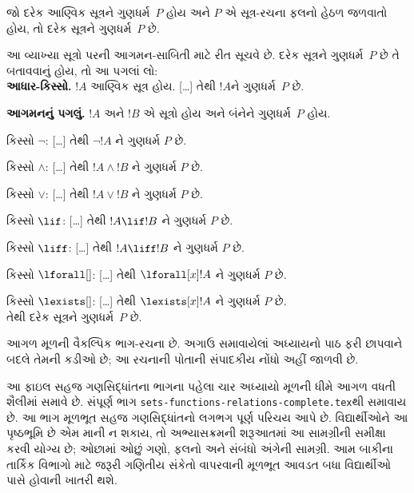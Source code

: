 \begin{defn}[સૂત્રો પર આગમન]
જો દરેક આણ્વિક સૂત્રને ગુણધર્મ~$P$ હોય અને
$P$ એ સૂત્ર-રચના ફલનો હેઠળ જળવાતો હોય,
તો દરેક સૂત્રને ગુણધર્મ~$P$ છે.
\end{defn}

\begin{explain}
આ વ્યાખ્યા સૂત્રો પરની આગમન-સાબિતી માટે રીત સૂચવે છે.
દરેક સૂત્રને ગુણધર્મ~$P$ છે તે બતાવવાનું હોય,
તો આ પગલાં લો:\\

\textbf{આધાર-કિસ્સો.} $!A$ આણ્વિક સૂત્ર હોય.
[\ldots] તેથી $!A$ને ગુણધર્મ~$P$ છે.

\textbf{આગમનનું પગલું.} $!A$ અને $!B$ એ સૂત્રો હોય
અને બંનેને ગુણધર્મ~$P$ હોય.

કિસ્સો $\lnot$: [\ldots] તેથી $\lnot !A$ ને ગુણધર્મ $P$ છે.

કિસ્સો $\land$: [\ldots] તેથી $!A \land !B$ ને ગુણધર્મ $P$ છે.

કિસ્સો $\lor$: [\ldots] તેથી $!A \lor !B$ ને ગુણધર્મ $P$ છે.

કિસ્સો $\lif$: [\ldots] તેથી $!A \lif !B$ ને ગુણધર્મ $P$ છે.

કિસ્સો $\liff$: [\ldots] તેથી $!A \liff !B$ ને ગુણધર્મ $P$ છે.

કિસ્સો $\lforall[]$: [\ldots] તેથી $\lforall[x] !A$ ને ગુણધર્મ $P$ છે.

કિસ્સો $\lexists[]$: [\ldots] તેથી $\lexists[x] !A$ ને ગુણધર્મ $P$ છે. \\

તેથી દરેક સૂત્રને ગુણધર્મ~$P$ છે.
\end{explain}
\endgroup

\begin{editorial}
આગળ મૂળની વૈકલ્પિક ભાગ-રચના છે. અગાઉ સમાવાયેલાં અધ્યાયનો પાઠ ફરી છાપવાને બદલે તેમની કડીઓ છે; આ રચનાની પોતાની સંપાદકીય નોંધો અહીં જાળવી છે.
\end{editorial}
\begingroup
\makeatletter{}\makeatother

\label{guunit:OLP-0720}


\begin{editorial}
  આ ફાઇલ સહજ ગણસિદ્ધાંતના ભાગના પહેલા ચાર અધ્યાયો
  મૂળની ધીમે આગળ વધતી શૈલીમાં સમાવે છે.
  સંપૂર્ણ ભાગ \verb|sets-functions-relations-complete.tex|થી સમાવાય છે.
  આ ભાગ મૂળભૂત સહજ ગણસિદ્ધાંતનો લગભગ પૂર્ણ પરિચય આપે છે.
  વિદ્યાર્થીઓને આ પૃષ્ઠભૂમિ છે એમ માની ન શકાય,
  તો અભ્યાસક્રમની શરૂઆતમાં આ સામગ્રીની સમીક્ષા કરવી યોગ્ય છે;
  ઓછામાં ઓછું ગણો, ફલનો અને સંબંધો અંગેની સામગ્રી.
  આમ બાકીના તાર્કિક વિભાગો માટે જરૂરી ગણિતીય સંકેતો વાપરવાની
  મૂળભૂત આવડત બધા વિદ્યાર્થીઓ પાસે હોવાની ખાતરી થશે.
\end{editorial}

